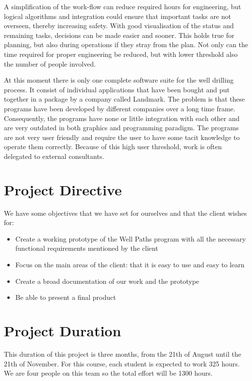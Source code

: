 \documentclass{report}
\begin{document}
A simplification of the work-flow can reduce required hours for engineering, but logical algorithms and integration could ensure that important tasks are not overseen, thereby increasing safety. With good visualisation of the status and remaining tasks, decisions can be made easier and sooner. This holds true for planning, but also during operations if they stray from the plan. Not only can the time required for proper engineering be reduced, but with lower threshold also the number of people involved.

At this moment there is only one complete software suite for the well drilling process. It consist of individual applications that have been bought and put together in a package by a company called Landmark. The problem is that these programs have been developed by different companies over a long time frame. Consequently, the programs have none or little integration with each other and are very outdated in both graphics and programming paradigm. The programs are not very user friendly and require the user to have some tacit knowledge to operate them correctly. Because of this high user threshold, work is often delegated to external consultants.

\newpage
\section{Project Directive} \label{sec:project_directive}
We have some objectives that we have set for ourselves and that the client wishes for:

\begin{itemize}
    \item Create a working prototype of the Well Paths program with all the necessary functional requirements mentioned by the client
    \item Focus on the main areas of the client: that it is easy to use and easy to learn
    \item Create a broad documentation of our work and the prototype
    \item Be able to present a final product
\end{itemize}

\newpage
\section{Project Duration} \label{sec:project_duration}
This duration of this project is three months, from the 21th of August until the 21th of November. For this course, each student is expected to work 325 hours. We are four people on this team so the total effort will be 1300 hours.
\end{document}
